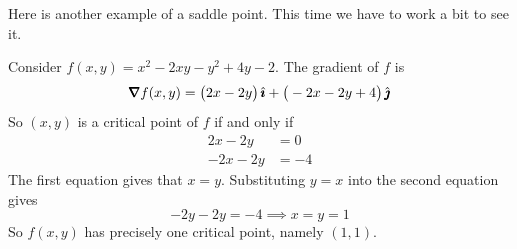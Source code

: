 Here is another example of a saddle point. This time we have to work
a bit to see it.

\begin{eg}[$f(x,y)= x^2-2xy-y^2+4y-2$]\label{eg maxminC}
Consider $f(x,y)= x^2-2xy-y^2+4y-2$. The gradient of $f$ is
\begin{equation*}
\vnabla f(x,y) = \big(2x-2y\big)\,\hi +\big(-2x-2y+4\big)\,\hj
\end{equation*}
So $(x,y)$ is a critical point of $f$ if and only if
\begin{align*}
2x-2y&=0 \\
-2x-2y&=-4
\end{align*}
The first equation gives that $x=y$.
Substituting $y=x$ into the second equation gives
\begin{equation*}
-2y-2y=-4\implies
x=y=1
\end{equation*}
So $f(x,y)$ has precisely one critical point, namely $(1,1)$.


\end{eg}
